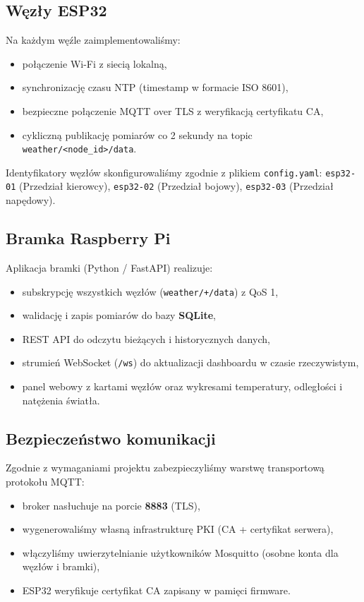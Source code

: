 \documentclass[12pt, a4paper]{article}
\begin{document}
\subsection{Węzły ESP32}
Na każdym węźle zaimplementowaliśmy:
\begin{itemize}
    \item połączenie Wi-Fi z siecią lokalną,
    \item synchronizację czasu NTP (timestamp w formacie ISO 8601),
    \item bezpieczne połączenie MQTT over TLS z weryfikacją certyfikatu CA,
    \item cykliczną publikację pomiarów co 2 sekundy na topic \texttt{weather/<node\_id>/data}.
\end{itemize}
Identyfikatory węzłów skonfigurowaliśmy zgodnie z plikiem \texttt{config.yaml}: \texttt{esp32-01} (Przedział kierowcy), \texttt{esp32-02} (Przedział bojowy), \texttt{esp32-03} (Przedział napędowy).

\subsection{Bramka Raspberry Pi}
Aplikacja bramki (Python / FastAPI) realizuje:
\begin{itemize}
    \item subskrypcję wszystkich węzłów (\texttt{weather/+/data}) z QoS 1,
    \item walidację i zapis pomiarów do bazy \textbf{SQLite},
    \item REST API do odczytu bieżących i historycznych danych,
    \item strumień WebSocket (\texttt{/ws}) do aktualizacji dashboardu w czasie rzeczywistym,
    \item panel webowy z kartami węzłów oraz wykresami temperatury, odległości i natężenia światła.
\end{itemize}

\subsection{Bezpieczeństwo komunikacji}
Zgodnie z wymaganiami projektu zabezpieczyliśmy warstwę transportową protokołu MQTT:
\begin{itemize}
    \item broker nasłuchuje na porcie \textbf{8883} (TLS),
    \item wygenerowaliśmy własną infrastrukturę PKI (CA + certyfikat serwera),
    \item włączyliśmy uwierzytelnianie użytkowników Mosquitto (osobne konta dla węzłów i bramki),
    \item ESP32 weryfikuje certyfikat CA zapisany w pamięci firmware.
\end{itemize}
\end{document}
